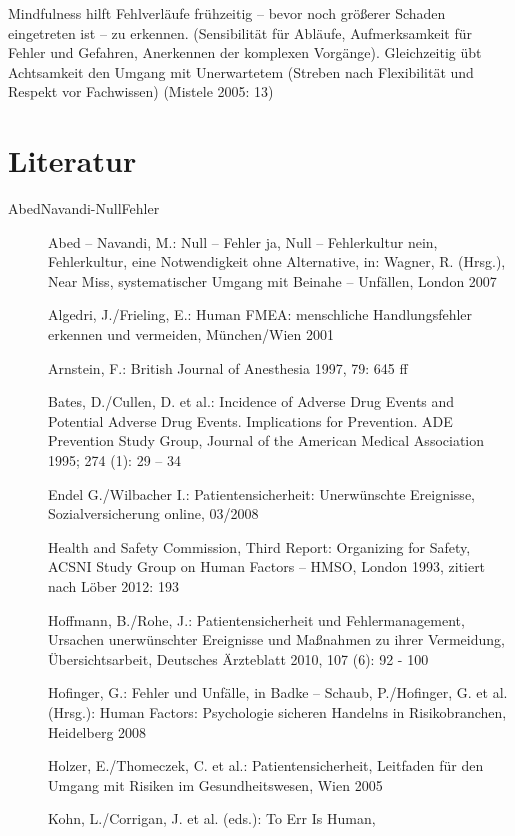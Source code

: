 Mindfulness hilft Fehlverläufe frühzeitig – bevor noch
größerer Schaden eingetreten ist – zu erkennen.
(Sensibilität für Abläufe, Aufmerksamkeit für Fehler und
Gefahren, Anerkennen der komplexen Vorgänge). Gleichzeitig
übt Achtsamkeit den Umgang mit Unerwartetem (Streben nach
Flexibilität und Respekt vor Fachwissen) (Mistele 2005: 13)







\section{Literatur}

\begin{description}
\item[AbedNavandi-NullFehler] Abed – Navandi, M.: Null – Fehler ja, Null –
Fehlerkultur nein, Fehlerkultur, eine Notwendigkeit ohne
Alternative, in: Wagner, R. (Hrsg.), Near Miss,
systematischer Umgang mit Beinahe – Unfällen, London 2007
\item[] Algedri, J./Frieling, E.: Human FMEA: menschliche
Handlungsfehler erkennen und vermeiden, München/Wien 2001
\item[] Arnstein, F.: British Journal of Anesthesia 1997, 79:
645 ff
\item[] Bates, D./Cullen, D. et al.: Incidence of Adverse Drug
Events and Potential Adverse Drug Events. Implications for
Prevention. ADE Prevention Study Group, Journal of the
American Medical Association 1995; 274 (1): 29 – 34
\item[] Endel G./Wilbacher I.: Patientensicherheit:
Unerwünschte Ereignisse, Sozialversicherung online, 03/2008
\item[] Health and Safety Commission, Third Report: Organizing
for Safety, ACSNI Study Group on Human Factors – HMSO,
London 1993, zitiert nach Löber 2012: 193
\item[] Hoffmann, B./Rohe, J.: Patientensicherheit und
Fehlermanagement, Ursachen unerwünschter Ereignisse und
Maßnahmen zu ihrer Vermeidung, Übersichtsarbeit, Deutsches
Ärzteblatt 2010, 107 (6): 92 - 100
\item[] Hofinger, G.: Fehler und Unfälle, in Badke – Schaub,
P./Hofinger, G. et al. (Hrsg.): Human Factors: Psychologie
sicheren Handelns in Risikobranchen, Heidelberg 2008
\item[] Holzer, E./Thomeczek, C. et al.: Patientensicherheit,
Leitfaden für den Umgang mit Risiken im Gesundheitswesen,
Wien 2005
\item[] Kohn, L./Corrigan, J. et al. (eds.): To Err Is Human,

\end{description}
